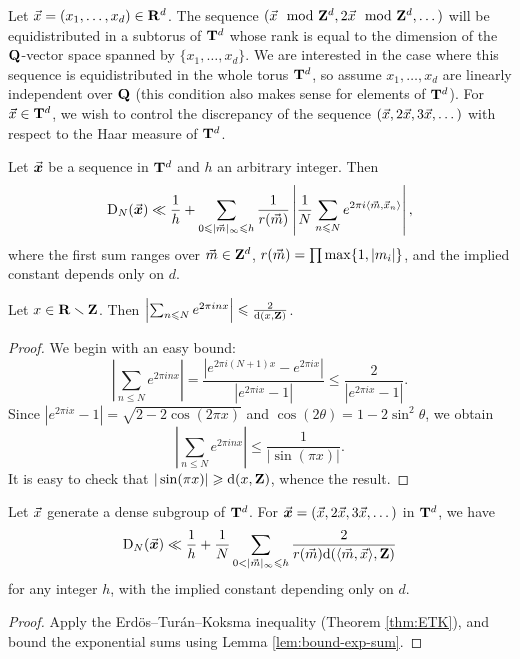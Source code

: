 Let $\vec{x}=(x_1,\dots,x_d)\in \mathbf{R}^d$. The sequence 
$(\vec{x}\mod {\mathbf{Z}}^d,2\vec{x}\mod{\mathbf{Z}}^d,\dots)$ will be equidistributed in a subtorus of 
$\mathbf{T}^d$ whose rank is equal to the dimension of the $\mathbf{Q}$-vector space 
spanned by $\{x_1,\dots,x_d\}$. We are interested in the case where this 
sequence is equidistributed in the whole torus $\mathbf{T}^d$, so assume 
$x_1,\dots,x_d$ are linearly independent over $\mathbf{Q}$ (this condition also 
makes sense for elements of $\mathbf{T}^d$). For $\vec{x}\in \mathbf{T}^d$, we wish 
to control the discrepancy of the sequence $(\vec{x},2\vec{x},3\vec{x},\dots)$ with respect 
to the Haar measure of $\mathbf{T}^d$. 

\begin{theorem}\label{thm:ETK}
Let $\vec{\boldsymbol x}$ be a sequence in $\mathbf{T}^d$ and $h$ an arbitrary integer. Then 
\[
	\operatorname{D}_N(\vec{\boldsymbol x}) \ll \frac 1 h + \sum_{0\leqslant |\vec{m}|_\infty \leqslant h} \frac{1}{r(\vec{m})} \left| \frac 1 N \sum_{n\leqslant N} e^{2\pi i \langle \vec{m},\vec{x}_n\rangle}\right| ,
\]
where the first sum ranges over $\vec{m}\in \mathbf{Z}^d$, 
$r(\vec{m}) = \prod \max\{1,|m_i|\}$, and the implied constant depends only on $d$. 
\end{theorem}

\begin{lemma}\label{lem:bound-exp-sum}
Let $x\in \mathbf{R}\smallsetminus \mathbf{Z}$. Then 
$\left| \sum_{n\leqslant N} e^{2\pi i n x}\right| \leqslant \frac{2}{\mathrm{d}(x, \mathbf{Z})}$. 
\end{lemma}
\begin{proof}
We begin with an easy bound: 
\[
	\left| \sum_{n\leqslant N} e^{2\pi i n x}\right| = \frac{|e^{2\pi i (N+1) x} - e^{2\pi i x}|}{|e^{2\pi i x} - 1|} \leqslant \frac{2}{|e^{2\pi i x} - 1|} .
\]
Since $|e^{2\pi i x} - 1| = \sqrt{2-2\cos(2\pi x)}$ and 
$\cos(2\theta) = 1-2\sin^2\theta$, we obtain 
\[
	\left|\sum_{n\leqslant N} e^{2\pi i n x}\right| \leqslant \frac{1}{|\sin(\pi x)|} .
\]
It is easy to check that $|\sin(\pi x)| \geqslant \mathrm{d}(x,\mathbf{Z})$, whence the result.  
\end{proof}

\begin{corollary}\label{cor:bound-disc-distance}
Let $\vec{x}$ generate a dense subgroup of $\mathbf{T}^d$. 
For $\vec{\boldsymbol x}=(\vec{x},2\vec{x},3\vec{x},\dots)$ in $\mathbf{T}^d$, we have 
\[
	\D_N(\bvx) \ll \frac 1 h + \frac 1 N \sum_{0<|\vm|_\infty \leqslant h} \frac{2}{r(\vm) \dd(\langle \vm,\vx\rangle,\bZ)} 
\]
for any integer $h$, with the implied constant depending only on $d$. 
\end{corollary}
\begin{proof}
Apply the Erd\"os--Tur\'an--Koksma inequality (Theorem \ref{thm:ETK}), and 
bound the exponential sums using Lemma \ref{lem:bound-exp-sum}. 
\end{proof}

